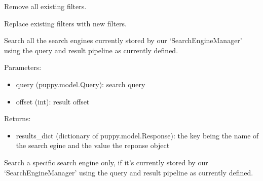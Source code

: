 \documentclass[letterpaper,10pt,english]{sphinxmanual}
\begin{document}
\begin{fulllineitems}
\begin{fulllineitems}
\end{fulllineitems}


\begin{fulllineitems}
\label{api2.0:puppy.pipeline.PipelineService.clear_filters}
Remove all existing filters.

\end{fulllineitems}


\begin{fulllineitems}
\label{api2.0:puppy.pipeline.PipelineService.replace_filters}
Replace existing filters with new filters.

\end{fulllineitems}


\begin{fulllineitems}
\label{api2.0:puppy.pipeline.PipelineService.searchAll}
Search all the search engines currently stored by our `SearchEngineManager' using the query and result pipeline as currently defined.

Parameters:
\begin{itemize}
\item {} 
query (puppy.model.Query): search query

\item {} 
offset (int): result offset

\end{itemize}

Returns:
\begin{itemize}
\item {} 
results\_dict (dictionary of puppy.model.Response): the key being the name of the search egine and the value the reponse object

\end{itemize}

\end{fulllineitems}


\begin{fulllineitems}
\label{api2.0:puppy.pipeline.PipelineService.searchSpecificEngine}
Search a specific search engine only, if it's currently stored by our `SearchEngineManager' using the query and result pipeline as currently defined.


\end{fulllineitems}
\end{fulllineitems}
\end{document}
